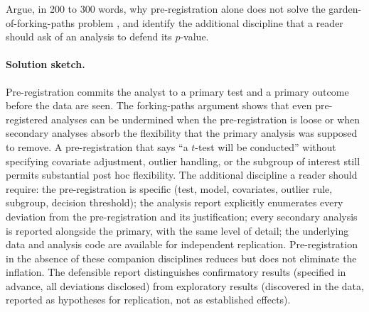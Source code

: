 \begin{exercise}
Argue, in 200 to 300 words, why pre-registration alone does not
solve the garden-of-forking-paths problem
\cite{method:gelman-loken-forking-paths}, and identify the
additional discipline that a reader should ask of an analysis to
defend its $p$-value.

\paragraph{Solution sketch.} Pre-registration commits the
analyst to a primary test and a primary outcome before the data
are seen. The forking-paths argument shows that even
pre-registered analyses can be undermined when the
pre-registration is loose or when secondary analyses absorb the
flexibility that the primary analysis was supposed to remove.
A pre-registration that says ``a $t$-test will be conducted''
without specifying covariate adjustment, outlier handling, or
the subgroup of interest still permits substantial post hoc
flexibility. The additional discipline a reader should require:
the pre-registration is specific (test, model, covariates,
outlier rule, subgroup, decision threshold); the analysis report
explicitly enumerates every deviation from the pre-registration
and its justification; every secondary analysis is reported
alongside the primary, with the same level of detail; the
underlying data and analysis code are available for independent
replication. Pre-registration in the absence of these companion
disciplines reduces but does not eliminate the inflation. The
defensible report distinguishes confirmatory results (specified
in advance, all deviations disclosed) from exploratory results
(discovered in the data, reported as hypotheses for replication,
not as established effects).
\end{exercise}

